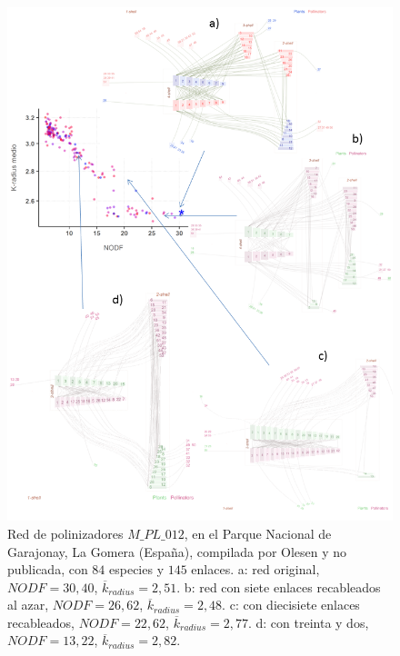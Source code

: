\clearpage
\begin{figure}[ht!]
\centering
\includegraphics[scale=0.80]{Figures/VIS_PL_012.png}
\caption {Red de polinizadores $M\_PL\_012$, en el Parque Nacional de Garajonay, La Gomera (España), compilada por Olesen y no publicada, con $84$ especies y $145$ enlaces. a: red original, $NODF = 30,40$, $\overline k_{radius} = 2,51$. b: red con siete enlaces recableados al azar, $NODF = 26,62$, $\overline k_{radius} = 2,48$. c: con diecisiete enlaces recableados, $NODF = 22,62$, $\overline k_{radius} = 2,77$. d: con treinta y dos, $NODF = 13,22$, $\overline k_{radius} = 2,82$.}
\label{fig:VIS_PL_012}
\end{figure}

